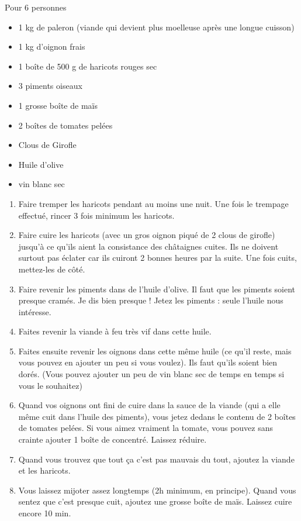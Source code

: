 \bigskip
{}
{Pour 6 personnes}{\begin{itemize}
	\item 1 kg de paleron (viande qui devient plus moelleuse après une longue cuisson)
	\item 1 kg d'oignon frais
	\item 1 boîte de 500 g de haricots rouges sec
	\item 3 piments oiseaux
	\item 1 grosse boîte de maïs
	\item 2 boîtes de tomates pelées
	\item Clous de Girofle
	\item Huile d'olive
	\item vin blanc sec
\end{itemize}}
{\begin{enumerate}
	\item Faire tremper les haricots pendant au moins une nuit. Une fois le trempage effectué, rincer 3 fois minimum les haricots.
	\item Faire cuire les haricots (avec un gros oignon piqué de 2 clous de girofle) jusqu'à ce qu'ils aient la consistance des châtaignes cuites. Ils ne doivent surtout pas éclater car ils cuiront 2 bonnes heures par la suite. Une fois cuits, mettez-les de côté.
	\item Faire revenir les piments dans de l'huile d'olive. Il faut que les piments soient presque cramés. Je dis bien presque ! Jetez les piments : seule l'huile nous intéresse.
	\item Faites revenir la viande à feu très vif dans cette huile.
	\item Faites ensuite revenir les oignons dans cette même huile (ce qu'il reste, mais vous pouvez en ajouter un peu si vous voulez). Ils faut qu'ils soient bien dorés. (Vous pouvez ajouter un peu de vin blanc sec de temps en temps si vous le souhaitez)
	\item Quand vos oignons ont fini de cuire dans la sauce de la viande (qui a elle même cuit dans l'huile des piments), vous jetez dedans le contenu de 2 boîtes de tomates pelées. Si vous aimez vraiment la tomate, vous pouvez sans crainte ajouter 1 boîte de concentré. Laissez réduire.
	\item Quand vous trouvez que tout ça c'est pas mauvais du tout, ajoutez la viande et les haricots.
	\item Vous laissez mijoter assez longtemps (2h minimum, en principe). Quand vous sentez que c'est presque cuit, ajoutez une grosse boîte de maïs. Laissez cuire encore 10 min.
\end{enumerate}}

